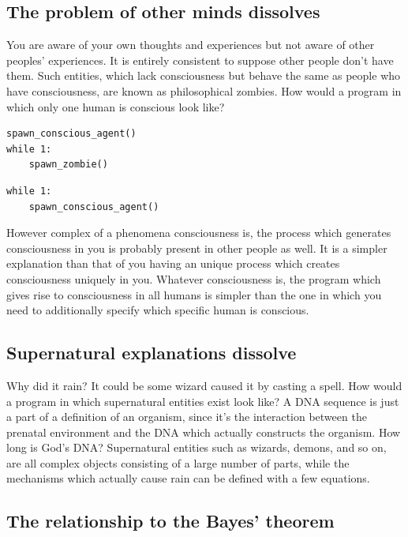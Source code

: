 \newpage

\subsection{The problem of other minds dissolves}

You are aware of your own thoughts and experiences but not aware of other peoples' experiences.
It is entirely consistent to suppose other people don't have them.
Such entities, which lack consciousness but behave the same as people who have consciousness, are known as philosophical zombies.
How would a program in which only one human is conscious look like?

\begin{lstlisting}[caption={A zombie-filled program.}]
spawn_conscious_agent()
while 1:
	spawn_zombie()
\end{lstlisting}

\begin{lstlisting}[caption={A more probable program.}]
while 1:
	spawn_conscious_agent()
\end{lstlisting}

However complex of a phenomena consciousness is, the process which generates consciousness in you is probably present in other people as well.
It is a simpler explanation than that of you having an unique process which creates consciousness uniquely in you.
Whatever consciousness is, the program which gives rise to consciousness in all humans is simpler than the one in which you need to additionally specify which specific human is conscious.

\newpage

\subsection{Supernatural explanations dissolve}

Why did it rain?
It could be some wizard caused it by casting a spell.
How would a program in which supernatural entities exist look like?
A DNA sequence is just a part of a definition of an organism, since it's the interaction between the prenatal environment and the DNA which actually constructs the organism.
How long is God's DNA?
Supernatural entities such as wizards, demons, and so on, are all complex objects consisting of a large number of parts, while the mechanisms which actually cause rain can be defined with a few equations.

\newpage

\subsection{The relationship to the Bayes' theorem}

